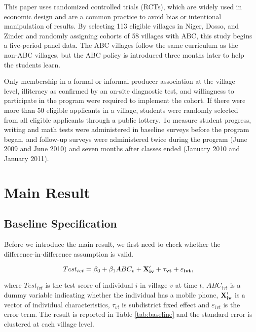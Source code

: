 \documentclass[12pt]{jfm}
\begin{document}
This paper uses randomized controlled trials (RCTs), which are widely used in economic design and are a common practice to avoid bias or intentional manipulation of results. By selecting 113 eligible villages in Niger, Dosso, and Zinder and randomly assigning cohorts of 58 villages with ABC, this study begins a five-period panel data. The ABC villages follow the same curriculum as the non-ABC villages, but the ABC policy is introduced three months later to help the students learn.

Only membership in a formal or informal producer association at the village level, illiteracy as confirmed by an on-site diagnostic test, and willingness to participate in the program were required to implement the cohort. If there were more than 50 eligible applicants in a village, students were randomly selected from all eligible applicants through a public lottery. To measure student progress, writing and math tests were administered in baseline surveys before the program began, and follow-up surveys were administered twice during the program (June 2009 and June 2010) and seven months after classes ended (January 2010 and January 2011).

\section{Main Result} \label{sec:mainresult}

\subsection{Baseline Specification} \label{subsec:baseline}

Before we introduce the main result, we first need to check whether the difference-in-difference assumption is valid.

\begin{equation}
  Test_{ivt} = \beta_0 + \beta_1 ABC_{v} + \bf{X}_{iv}^\prime + \tau_{vt} + \varepsilon_{ivt}, \label{eq:baseline}
\end{equation}

where $Test_{ivt}$ is the test score of individual $i$ in village $v$ at time $t$, $ABC_{ivt}$ is a dummy variable indicating whether the individual has a mobile phone, $\bf{X}_{iv}^\prime$ is a vector of individual characteristics, $\tau_{vt}$ is subdistrict fixed effect and $\varepsilon_{ivt}$ is the error term. The result is reported in Table \ref{tab:baseline} and the standard error is clustered at each village level.
\end{document}
